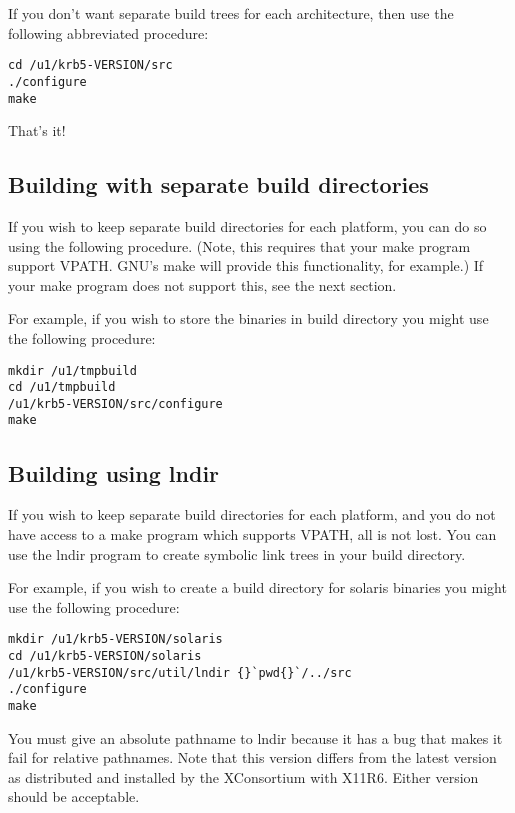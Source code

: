 \documentclass[letterpaper,10pt,english]{sphinxmanual}
\begin{document}
If you don't want separate build trees for each architecture, then use
the following abbreviated procedure:

\begin{Verbatim}[commandchars=\\\{\}]
cd /u1/krb5-VERSION/src
./configure
make
\end{Verbatim}

That's it!


\subsection{Building with separate build directories}
\label{build/doing_build:building-with-separate-build-directories}
If you wish to keep separate build directories for each platform, you
can do so using the following procedure.  (Note, this requires that
your make program support VPATH.  GNU's make will provide this
functionality, for example.)  If your make program does not support
this, see the next section.

For example, if you wish to store the binaries in  build
directory you might use the following procedure:

\begin{Verbatim}[commandchars=\\\{\}]
mkdir /u1/tmpbuild
cd /u1/tmpbuild
/u1/krb5-VERSION/src/configure
make
\end{Verbatim}


\subsection{Building using lndir}
\label{build/doing_build:building-using-lndir}
If you wish to keep separate build directories for each platform, and
you do not have access to a make program which supports VPATH, all is
not lost.  You can use the lndir program to create symbolic link trees
in your build directory.

For example, if you wish to create a build directory for solaris
binaries you might use the following procedure:

\begin{Verbatim}[commandchars=\\\{\}]
mkdir /u1/krb5-VERSION/solaris
cd /u1/krb5-VERSION/solaris
/u1/krb5-VERSION/src/util/lndir {}`pwd{}`/../src
./configure
make
\end{Verbatim}

You must give an absolute pathname to lndir because it has a bug that
makes it fail for relative pathnames.  Note that this version differs
from the latest version as distributed and installed by the
XConsortium with X11R6.  Either version should be acceptable.
\end{document}
